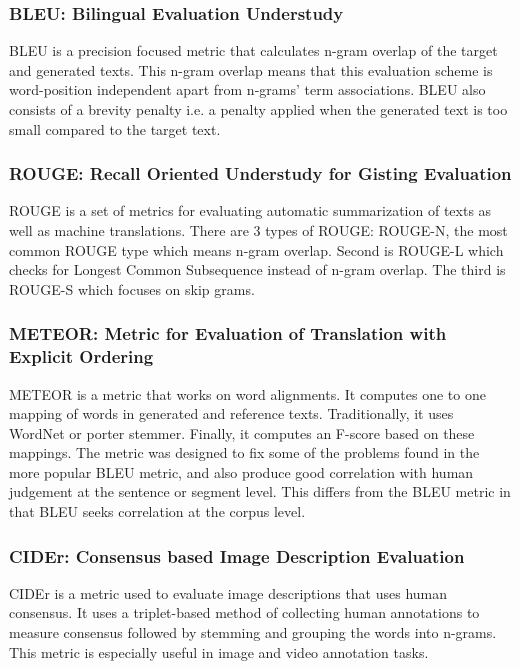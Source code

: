 \subsubsection{BLEU: Bilingual Evaluation Understudy}

\par BLEU \cite{bleu} is a precision focused metric that calculates n-gram overlap of the target and generated texts. This n-gram overlap means that this evaluation scheme is word-position independent apart from n-grams' term associations. BLEU also consists of a brevity penalty i.e. a penalty applied when the generated text is too small compared to the target text.


\subsubsection{ROUGE: Recall Oriented Understudy for Gisting Evaluation}

\par ROUGE \cite{rouge} is a set of metrics for evaluating automatic summarization of texts as well as machine translations. There are 3 types of ROUGE: ROUGE-N, the most common ROUGE type which means n-gram overlap. Second is ROUGE-L which checks for Longest Common Subsequence instead of n-gram overlap. The third is ROUGE-S which focuses on skip grams.


\subsubsection{METEOR: Metric for Evaluation of Translation with Explicit Ordering}

\par METEOR \cite{meteor} is a metric that works on word alignments. It computes one to one mapping of words in generated and reference texts. Traditionally, it uses WordNet or porter stemmer. Finally, it computes an F-score based on these mappings. The metric was designed to fix some of the problems found in the more popular BLEU metric, and also produce good correlation with human judgement at the sentence or segment level. This differs from the BLEU metric in that BLEU seeks correlation at the corpus level.


\subsubsection{CIDEr: Consensus based Image Description Evaluation}

\par CIDEr \cite{cider} is a metric used to evaluate image descriptions that uses human consensus. It uses a triplet-based method of collecting human annotations to measure consensus followed by stemming and grouping the words into n-grams. This metric is especially useful in image and video annotation tasks.

